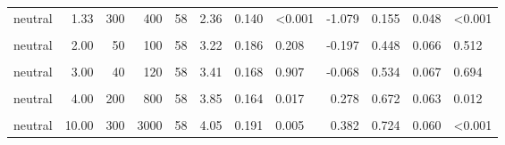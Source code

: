 \documentclass[
]{article}
\begin{document}
\begin{longtable}[t]{lrrrrrrlrrrl}
\hspace{1em}neutral & 1.33 & 300 & 400 & 58 & 2.36 & 0.140 & <0.001 & -1.079 & 0.155 & 0.048 & <0.001\\
\hspace{1em}\cellcolor{gray!10}{neutral} & \cellcolor{gray!10}{2.00} & \cellcolor{gray!10}{20} & \cellcolor{gray!10}{40} & \cellcolor{gray!10}{58} & \cellcolor{gray!10}{2.97} & \cellcolor{gray!10}{0.186} & \cellcolor{gray!10}{0.006} & \cellcolor{gray!10}{-0.381} & \cellcolor{gray!10}{0.345} & \cellcolor{gray!10}{0.064} & \cellcolor{gray!10}{0.025}\\
\hspace{1em}neutral & 2.00 & 50 & 100 & 58 & 3.22 & 0.186 & 0.208 & -0.197 & 0.448 & 0.066 & 0.512\\
\hspace{1em}\cellcolor{gray!10}{neutral} & \cellcolor{gray!10}{3.00} & \cellcolor{gray!10}{10} & \cellcolor{gray!10}{30} & \cellcolor{gray!10}{58} & \cellcolor{gray!10}{2.97} & \cellcolor{gray!10}{0.155} & \cellcolor{gray!10}{0.002} & \cellcolor{gray!10}{-0.457} & \cellcolor{gray!10}{0.345} & \cellcolor{gray!10}{0.064} & \cellcolor{gray!10}{0.025}\\
\hspace{1em}neutral & 3.00 & 40 & 120 & 58 & 3.41 & 0.168 & 0.907 & -0.068 & 0.534 & 0.067 & 0.694\\
\hspace{1em}\cellcolor{gray!10}{neutral} & \cellcolor{gray!10}{4.00} & \cellcolor{gray!10}{20} & \cellcolor{gray!10}{80} & \cellcolor{gray!10}{58} & \cellcolor{gray!10}{3.21} & \cellcolor{gray!10}{0.166} & \cellcolor{gray!10}{0.112} & \cellcolor{gray!10}{-0.234} & \cellcolor{gray!10}{0.431} & \cellcolor{gray!10}{0.066} & \cellcolor{gray!10}{0.358}\\
\hspace{1em}neutral & 4.00 & 200 & 800 & 58 & 3.85 & 0.164 & 0.017 & 0.278 & 0.672 & 0.063 & 0.012\\
\hspace{1em}\cellcolor{gray!10}{neutral} & \cellcolor{gray!10}{10.00} & \cellcolor{gray!10}{40} & \cellcolor{gray!10}{400} & \cellcolor{gray!10}{58} & \cellcolor{gray!10}{3.95} & \cellcolor{gray!10}{0.160} & \cellcolor{gray!10}{0.002} & \cellcolor{gray!10}{0.372} & \cellcolor{gray!10}{0.741} & \cellcolor{gray!10}{0.059} & \cellcolor{gray!10}{<0.001}\\
\hspace{1em}neutral & 10.00 & 300 & 3000 & 58 & 4.05 & 0.191 & 0.005 & 0.382 & 0.724 & 0.060 & <0.001\\

\end{longtable}
\end{document}

